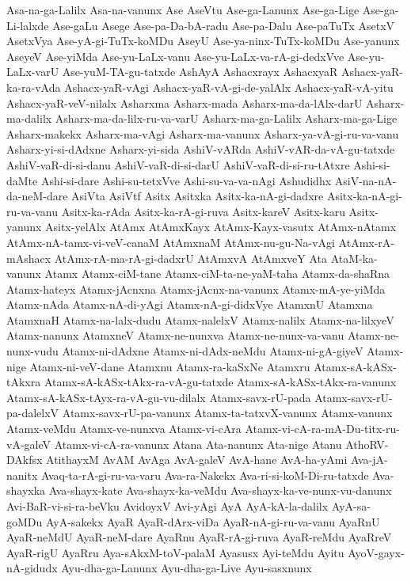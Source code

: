 {Asa-na-ga-Lalilx
Asa-na-vanunx
Ase
AseVtu
Ase-ga-Lanunx
Ase-ga-Lige
Ase-ga-Li-lalxde
Ase-gaLu
Asege
Ase-pa-Da-bA-radu
Ase-pa-Dalu
Ase-paTuTx
AsetxV
AsetxVya
Ase-yA-gi-TuTx-koMDu
AseyU
Ase-ya-ninx-TuTx-koMDu
Ase-yanunx
AseyeV
Ase-yiMda
Ase-yu-LaLx-vanu
Ase-yu-LaLx-va-rA-gi-dedxVve
Ase-yu-LaLx-varU
Ase-yuM-TA-gu-tatxde
AshAyA
Ashacxrayx
AshacxyaR
Ashacx-yaR-ka-ra-vAda
Ashacx-yaR-vAgi
Ashacx-yaR-vA-gi-de-yalAlx
Ashacx-yaR-vA-yitu
Ashacx-yaR-veV-nilalx
Asharxma
Asharx-mada
Asharx-ma-da-lAlx-darU
Asharx-ma-dalilx
Asharx-ma-da-lilx-ru-va-varU
Asharx-ma-ga-Lalilx
Asharx-ma-ga-Lige
Asharx-makekx
Asharx-ma-vAgi
Asharx-ma-vanunx
Asharx-ya-vA-gi-ru-va-vanu
Asharx-yi-si-dAdxne
Asharx-yi-sida
AshiV-vARda
AshiV-vAR-da-vA-gu-tatxde
AshiV-vaR-di-si-danu
AshiV-vaR-di-si-darU
AshiV-vaR-di-si-ru-tAtxre
Ashi-si-daMte
Ashi-si-dare
Ashi-su-tetxVve
Ashi-su-va-va-nAgi
Ashudidhx
AsiV-na-nA-da-neM-dare
AsiVta
AsiVtf
Asitx
Asitxka
Asitx-ka-nA-gi-dadxre
Asitx-ka-nA-gi-ru-va-vanu
Asitx-ka-rAda
Asitx-ka-rA-gi-ruva
Asitx-kareV
Asitx-karu
Asitx-yanunx
Asitx-yelAlx
AtAmx
AtAmxKayx
AtAmx-Kayx-vasutx
AtAmx-nAtamx
AtAmx-nA-tamx-vi-veV-canaM
AtAmxnaM
AtAmx-nu-gu-Na-vAgi
AtAmx-rA-mAshacx
AtAmx-rA-ma-rA-gi-dadxrU
AtAmxvA
AtAmxveY
Ata
AtaM-ka-vanunx
Atamx
Atamx-ciM-tane
Atamx-ciM-ta-ne-yaM-taha
Atamx-da-shaRna
Atamx-hateyx
Atamx-jAcnxna
Atamx-jAcnx-na-vanunx
Atamx-mA-ye-yiMda
Atamx-nAda
Atamx-nA-di-yAgi
Atamx-nA-gi-didxVye
AtamxnU
Atamxna
AtamxnaH
Atamx-na-lalx-dudu
Atamx-nalelxV
Atamx-nalilx
Atamx-na-lilxyeV
Atamx-nanunx
AtamxneV
Atamx-ne-nunxva
Atamx-ne-nunx-va-vanu
Atamx-ne-nunx-vudu
Atamx-ni-dAdxne
Atamx-ni-dAdx-neMdu
Atamx-ni-gA-giyeV
Atamx-nige
Atamx-ni-veV-dane
Atamxnu
Atamx-ra-kaSxNe
Atamxru
Atamx-sA-kASx-tAkxra
Atamx-sA-kASx-tAkx-ra-vA-gu-tatxde
Atamx-sA-kASx-tAkx-ra-vanunx
Atamx-sA-kASx-tAyx-ra-vA-gu-vu-dilalx
Atamx-savx-rU-pada
Atamx-savx-rU-pa-dalelxV
Atamx-savx-rU-pa-vanunx
Atamx-ta-tatxvX-vanunx
Atamx-vanunx
Atamx-veMdu
Atamx-ve-nunxva
Atamx-vi-cAra
Atamx-vi-cA-ra-mA-Du-titx-ru-vA-galeV
Atamx-vi-cA-ra-vanunx
Atana
Ata-nanunx
Ata-nige
Atanu
AthoRV-DAkfsx
AtithayxM
AvAM
AvAga
AvA-galeV
AvA-hane
AvA-ha-yAmi
Ava-jA-nanitx
Avaq-ta-rA-gi-ru-va-varu
Ava-ra-Nakekx
Ava-ri-si-koM-Di-ru-tatxde
Ava-shayxka
Ava-shayx-kate
Ava-shayx-ka-veMdu
Ava-shayx-ka-ve-nunx-vu-danunx
Avi-BaR-vi-si-ra-beVku
AvidoyxV
Avi-yAgi
AyA
AyA-kA-la-dalilx
AyA-sa-goMDu
AyA-sakekx
AyaR
AyaR-dArx-viDa
AyaR-nA-gi-ru-va-vanu
AyaRnU
AyaR-neMdU
AyaR-neM-dare
AyaRnu
AyaR-rA-gi-ruva
AyaR-reMdu
AyaRreV
AyaR-rigU
AyaRru
Aya-sAkxM-toV-palaM
Ayasusx
Ayi-teMdu
Ayitu
AyoV-gayx-nA-gidudx
Ayu-dha-ga-Lanunx
Ayu-dha-ga-Live
Ayu-sasxnunx
}

